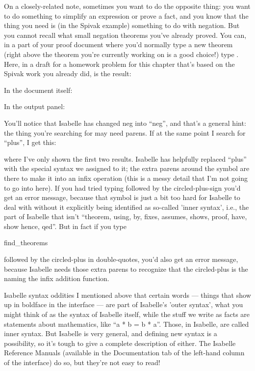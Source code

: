 On a closely-related note, sometimes you want to do the opposite thing: you want to do something to simplify an expression or prove a fact, and you know that the thing you need is (in the Spivak example) something to do with negation. But you cannot recall what small negation theorems you've already proved. You can, in a part of your proof document where you'd normally type a new theorem (right above the theorem you're currently working on is a good choice!) type . Here, in a draft for a homework problem for this chapter that's based on the Spivak work you already did, is the result:

In the document itself:

In the output panel:
 

You'll notice that Isabelle has changed neg into ``neg'', and that's a general hint: the thing you're searching for may need parens. If at the same point I search for ``plus'', I get this:

where I've only shown the first two results. Isabelle has helpfully replaced ``plus'' with the special syntax we assigned to it; the extra parens around the symbol are there to make it into an infix operation (this is a messy detail that I'm not going to go into here). If you had tried typing  followed by the circled-plus-sign
you'd get an error message, because that symbol is just a bit too hard for Isabelle to deal with without it explicitly being identified as so-called 'inner syntax', i.e., the part of Isabelle that isn't ``theorem, using, by, fixes, assumes, shows, proof, have, show hence, qed''. But in fact if you type 
\begin{IS}
find_theorems 
\end{IS}
followed by the circled-plus in double-quotes,
you'd also get an error message, because Isabelle needs those extra parens to recognize that the circled-plus is the naming the infix addition function. 

Isabelle syntax oddities
I mentioned above that certain words --- things that show up in boldface in the interface --- are part of Isabelle's 'outer syntax', what you might think of as the syntax of Isabelle itself, while the stuff we write as facts are statements about mathematics, like ``a * b = b * a''. Those, in Isabelle, are called inner syntax. But Isabelle is very general, and defining new syntax is a possibility, so it's tough to give a complete description of either. The Isabelle Reference Manuals (available in the Documentation tab of the left-hand column of the interface) do so, but they're not easy to read! 

